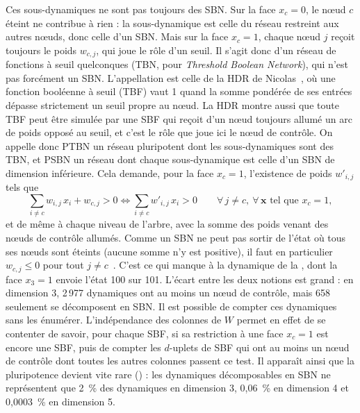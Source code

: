 \documentclass[12pt, a4paper]{article}
\begin{document}
Ces sous-dynamiques ne sont pas toujours des SBN.
Sur la face $x_c = 0$, le nœud $c$ éteint ne contribue à rien : la sous-dynamique est celle du réseau restreint aux autres nœuds, donc celle d'un SBN.
Mais sur la face $x_c = 1$, chaque nœud $j$ reçoit toujours le poids $w_{c,j}$, qui joue le rôle d'un seuil.
Il s'agit donc d'un réseau de fonctions à seuil quelconques (TBN, pour \emph{Threshold Boolean Network}), qui n'est pas forcément un SBN.
L'appellation est celle de la HDR de Nicolas~\cite{glade2022}, où une fonction booléenne à seuil (TBF) vaut 1 quand la somme pondérée de ses entrées dépasse strictement un seuil propre au nœud.
La HDR montre aussi que toute TBF peut être simulée par une SBF qui reçoit d'un nœud toujours allumé un arc de poids opposé au seuil, et c'est le rôle que joue ici le nœud de contrôle.
On appelle donc PTBN un réseau pluripotent dont les sous-dynamiques sont des TBN, et PSBN un réseau dont chaque sous-dynamique est celle d'un SBN de dimension inférieure.
Cela demande, pour la face $x_c = 1$, l'existence de poids $w'_{i,j}$ tels que
\begin{equation}
\sum_{i \neq c} w_{i,j}\, x_i + w_{c,j} > 0
\iff
\sum_{i \neq c} w'_{i,j}\, x_i > 0
\qquad \forall\, j \neq c,\ \forall\, \mathbf{x} \text{ tel que } x_c = 1 ,
\end{equation}
et de même à chaque niveau de l'arbre, avec la somme des poids venant des nœuds de contrôle allumés.
Comme un SBN ne peut pas sortir de l'état où tous ses nœuds sont éteints (aucune somme n'y est positive), il faut en particulier $w_{c,j} \le 0$ pour tout $j \neq c$~\cite{wu2024}.
C'est ce qui manque à la dynamique de la , dont la face $x_3 = 1$ envoie l'état 100 sur 101.
L'écart entre les deux notions est grand : en dimension 3, 2\,977 dynamiques ont au moins un nœud de contrôle, mais 658 seulement se décomposent en SBN.
Il est possible de compter ces dynamiques sans les énumérer.
L'indépendance des colonnes de $W$ permet en effet de se contenter de savoir, pour chaque SBF, si sa restriction à une face $x_c = 1$ est encore une SBF, puis de compter les $d$-uplets de SBF qui ont au moins un nœud de contrôle dont toutes les autres colonnes passent ce test.
Il apparaît ainsi que la pluripotence devient vite rare () : les dynamiques décomposables en SBN ne représentent que 2~\% des dynamiques en dimension 3, 0,06~\% en dimension 4 et 0,0003~\% en dimension 5.
\end{document}
